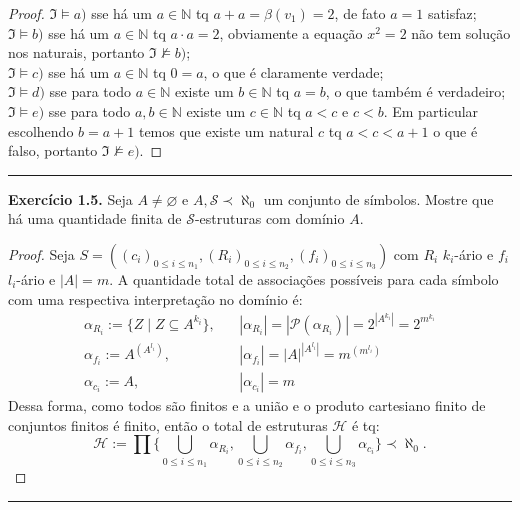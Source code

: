 \documentclass[11pt]{article}
\newcommand{\mc}[1]{\mathcal{#1}}
\newcommand{\mf}[1]{\mathfrak{#1}}
\newcommand{\mbb}[1]{\mathbb{#1}}
\begin{document}
\begin{proof}
    $\mf{I}\vDash a)$ sse há um $a\in\mbb{N}$ tq $a+a=\beta(v_1)=2$, de fato $a=1$ satisfaz;\\
    $\mf{I}\vDash b)$ sse há um $a\in\mbb{N}$ tq $a\cdot a=2$, obviamente a equação $x^2=2$ não tem solução nos naturais, portanto $\mf{I}\nvDash b)$;\\
    $\mf{I}\vDash c)$ sse há um $a\in\mbb{N}$ tq $0=a$, o que é claramente verdade;\\
    $\mf{I}\vDash d)$ sse para todo $a\in\mbb{N}$ existe um $b\in\mbb{N}$ tq $a = b$, o que também é verdadeiro;\\
    $\mf{I}\vDash e)$ sse para todo $a,b\in\mbb{N}$ existe um $c\in\mbb{N}$ tq $a<c$ e $c<b$. Em particular escolhendo $b = a+1$ temos que existe um natural $c$ tq $a < c < a+1$ o que é falso, portanto $\mf{I}\nvDash e)$.
\end{proof}

\hrule

\begin{shaded}
\textbf{Exercício 1.5.} Seja $A\ne\varnothing$ e $A,\mc{S}\prec\aleph_0$ um conjunto de símbolos. Mostre que há uma quantidade finita de $\mc{S}$-estruturas com domínio $A$.
\end{shaded}

\begin{proof}
Seja $S=((c_i)_{0\le i\le n_1},(R_i)_{0\le i\le n_2},(f_i)_{0\le i\le n_3})$ com $R_i$ $k_i$-ário e $f_i$ $l_i$-ário e $|A|=m$. A quantidade total de associações possíveis para cada símbolo com uma respectiva interpretação no domínio é:
\begin{align*}
    \alpha_{R_i} :=\{Z\mid Z\subseteq A^{k_i}\}, & ~~~~|\alpha_{R_i}| =|\mc{P}(\alpha_{R_i})| = 2^{|A^{k_i}|}=2^{m^{k_i}}\\
    \alpha_{f_i} :=A^{\left(A^{l_i}\right)}, & ~~~~|\alpha_{f_i}| = |A|^{|A^{l_i}|} = m^{\left(m^{l_i}\right)}\\
    \alpha_{c_i} := A, & ~~~~|\alpha_{c_i}| = m
\end{align*}
Dessa forma, como todos são finitos e a união e o produto cartesiano finito de conjuntos finitos é finito, então o total de estruturas $\mc{H}$ é tq:
\[
\mc{H}:=\prod\Biggl\{\bigcup_{0\le i\le n_1}\alpha_{R_i},\bigcup_{0\le i\le n_2}\alpha_{f_i},\bigcup_{0\le i\le n_3}\alpha_{c_i}\Biggr\}\prec\aleph_0.
\]
\end{proof}

\hrule
\end{document}
